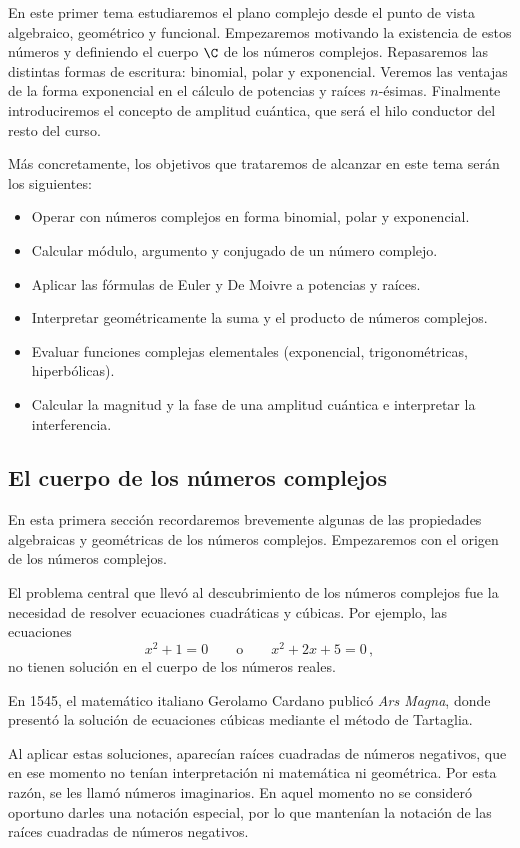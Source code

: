 En este primer tema estudiaremos el plano complejo desde el punto de vista algebraico, geométrico y funcional. Empezaremos motivando la existencia de estos números y definiendo el cuerpo $\C$ de los números complejos. Repasaremos las distintas formas de escritura: binomial, polar y exponencial. Veremos las ventajas de la forma exponencial en el cálculo de potencias y raíces $n$-ésimas. Finalmente introduciremos el concepto de amplitud cuántica, que será el hilo conductor del resto del curso.

Más concretamente, los objetivos que trataremos de alcanzar en este tema serán los siguientes:

\begin{itemize}
  \item Operar con números complejos en forma binomial, polar y exponencial.
  \item Calcular módulo, argumento y conjugado de un número complejo.
  \item Aplicar las fórmulas de Euler y De Moivre a potencias y raíces.
  \item Interpretar geométricamente la suma y el producto de números complejos.
  \item Evaluar funciones complejas elementales (exponencial, trigonométricas, hiperbólicas).
  \item Calcular la magnitud y la fase de una amplitud cuántica e interpretar la interferencia.
\end{itemize}

\subsection{El cuerpo de los números complejos}

En esta primera sección recordaremos brevemente algunas de las propiedades algebraicas y geométricas de los números complejos. Empezaremos con el origen de los números complejos.

El problema central que llevó al descubrimiento de los números complejos fue la necesidad de resolver ecuaciones cuadráticas y cúbicas. Por ejemplo, las ecuaciones
\[
  x^2 + 1 = 0 \qquad \text{o} \qquad x^2 + 2x + 5 = 0\,,
\]
no tienen solución en el cuerpo de los números reales.

En 1545, el matemático italiano Gerolamo Cardano publicó \textit{Ars Magna}, donde presentó la solución de ecuaciones cúbicas mediante el método de Tartaglia.

Al aplicar estas soluciones, aparecían raíces cuadradas de números negativos, que en ese momento no tenían interpretación ni matemática ni geométrica. Por esta razón, se les llamó números imaginarios. En aquel momento no se consideró oportuno darles una notación especial, por lo que mantenían la notación de las raíces cuadradas de números negativos.

